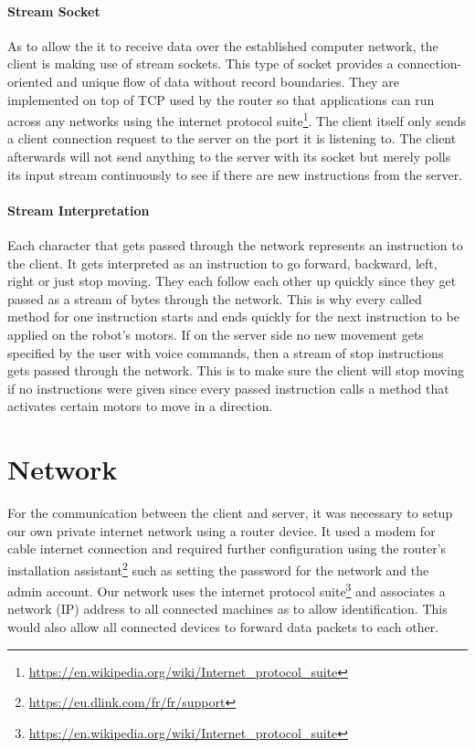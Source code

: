 \paragraph{Stream Socket}
As to allow the it to receive data over the established computer network, the client is making use of stream sockets. This type of socket provides a connection-oriented and unique flow of data without record boundaries. They are implemented on top of TCP used by the router so that applications can run across any networks using the internet protocol suite\footnote{\protect\url{https://en.wikipedia.org/wiki/Internet_protocol_suite}}.
The client itself only sends a client connection request to the server on the port it is listening to. The client afterwards will not send anything to the server with its socket but merely polls its input stream continuously to see if there are new instructions from the server.

\newpage



\paragraph{Stream Interpretation}
Each character that gets passed through the network represents an instruction to the client. It gets interpreted as an instruction to go forward, backward, left, right or just stop moving. They each follow each other up quickly since they get passed as a stream of bytes through the network. This is why every called method for one instruction starts and ends quickly for the next instruction to be applied on the robot's motors. If on the server side no new movement gets specified by the user with voice commands, then a stream of stop instructions gets passed through the network. This is to make sure the client will stop moving if no instructions were given since every passed instruction calls a method that activates certain motors to move in a direction.

\newpage
\section{Network}
For the communication between the client and server, it was necessary to setup our own private internet network using a router device. It used a modem for cable internet connection and required further configuration using the router's installation assistant\footnote{\url{https://eu.dlink.com/fr/fr/support}} such as setting the password for the network and the admin account. Our network uses the internet protocol suite\footnote{\url{https://en.wikipedia.org/wiki/Internet_protocol_suite}} and associates a network (IP) address to all connected machines as to allow identification. This would also allow all connected devices to forward data packets to each other.


